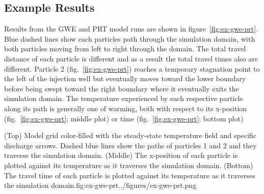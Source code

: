 

\subsection{Example Results}

Results from the GWE and PRT model runs are shown in figure~\ref{fig:ex-gwe-prt}. Blue dashed lines show each particles path through the simulation domain, with both particles moving from left to right through the domain.  The total travel distance of each particle is different and as a result the total travel times also are different.  Particle 2 (fig.~\ref{fig:ex-gwe-prt}) reaches a temporary stagnation point to the left of the injection well but eventually moves toward the lower boundary before being swept toward the right boundary where it eventually exits the simulation domain.  The temperature experienced by each respective particle along its path is generally one of warming, both with respect to its x-position (fig.~\ref{fig:ex-gwe-prt}; middle plot) or time (fig.~\ref{fig:ex-gwe-prt}; bottom plot)

\begin{StandardFigure}{
   (Top) Model grid color-filled with the steady-state temperature field and specific discharge arrows.  Dashed blue lines show the paths of particles 1 and 2 and they traverse the simulation domain. (Middle) The x-position of each particle is plotted against its temperature as it traverses the simulation domain. (Bottom) The travel time of each particle is plotted against its temperature as it traverses the simulation domain.}{fig:ex-gwe-prt}{../figures/ex-gwe-prt.png}
\end{StandardFigure}
